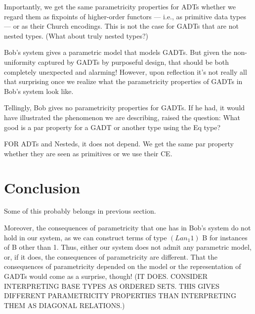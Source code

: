 \documentclass[acmsmall,screen,review,anonymous]{acmart}
\theoremstyle{definition}
\begin{document}
Importantly, we get the same parametricity properties for ADTs whether
we regard them as fixpoints of higher-order functors --- i.e., as
primitive data types --- or as their Church encodings. This is not the
case for GADTs that are not nested types. (What about truly nested
types?)

Bob's system gives a parametric model that models GADTs. But given the
non-uniformity captured by GADTs by purposeful design, that should be
both completely unexpected and alarming! However, upon reflection it's
not really all that surprising once we realize what the parametricity
properties of GADTs in Bob's system look like.


Tellingly, Bob gives no parametricity properties for GADTs. If he had,
it would have illustrated the phenomenon we are describing, raised the
question: What good is a par property for a GADT or another type using
the Eq type?

FOR ADTs and Nesteds, it does not depend. We get the same par property
whether they are seen as primitives or we use their CE.

\section{Conclusion}

{\color{blue} Some of this probably belongs in previous section.}

Moreover, the consequences of parametricity that one has in Bob's
system do not hold in our system, as we can construct terms of type
$(Lan_1 1)$ B for instances of B other than 1.  Thus, either our
system does not admit any parametric model, or, if it does, the
consequences of parametricity are different.  That the consequences of
parametricity depended on the model or the representation of GADTs
would come as a surprise, though!  (IT DOES. CONSIDER INTERPRETING
BASE TYPES AS ORDERED SETS. THIS GIVES DIFFERENT PARAMETRICITY
PROPERTIES THAN INTERPRETING THEM AS DIAGONAL RELATIONS.)
\end{document}
